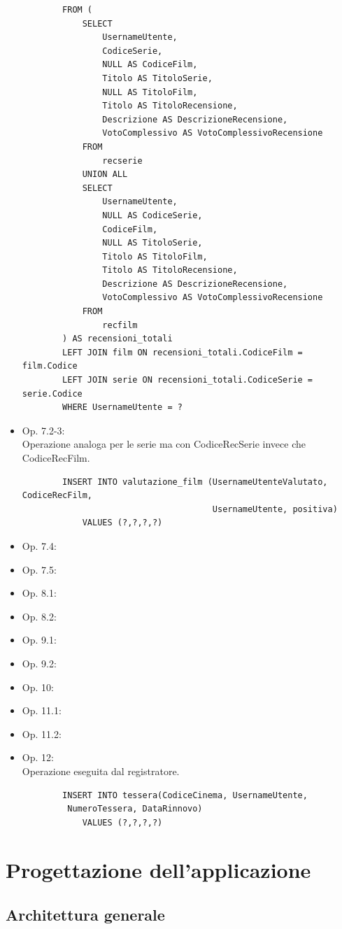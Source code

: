 \documentclass[a4paper,12pt]{report}
\begin{document}
\begin{itemize}
\begin{verbatim}
		FROM (
			SELECT
				UsernameUtente,
				CodiceSerie,
				NULL AS CodiceFilm,
				Titolo AS TitoloSerie,
				NULL AS TitoloFilm,
				Titolo AS TitoloRecensione,
				Descrizione AS DescrizioneRecensione,
				VotoComplessivo AS VotoComplessivoRecensione
			FROM
				recserie
			UNION ALL
			SELECT
				UsernameUtente,
				NULL AS CodiceSerie,
				CodiceFilm,
				NULL AS TitoloSerie,
				Titolo AS TitoloFilm,
				Titolo AS TitoloRecensione,
				Descrizione AS DescrizioneRecensione,
				VotoComplessivo AS VotoComplessivoRecensione
			FROM
				recfilm
		) AS recensioni_totali
		LEFT JOIN film ON recensioni_totali.CodiceFilm = film.Codice
		LEFT JOIN serie ON recensioni_totali.CodiceSerie = serie.Codice
		WHERE UsernameUtente = ?
	\end{verbatim}
	\item Op. 7.2-3:\\
	Operazione analoga per le serie ma con CodiceRecSerie invece che CodiceRecFilm.
	\begin{verbatim}
		INSERT INTO valutazione_film (UsernameUtenteValutato, CodiceRecFilm,
									  UsernameUtente, positiva)
			VALUES (?,?,?,?)
	\end{verbatim}
	\item Op. 7.4: 
	\item Op. 7.5: 
	\item Op. 8.1: 
	\item Op. 8.2: 
	\item Op. 9.1: 
	\item Op. 9.2: 
	\item Op. 10: 
	\item Op. 11.1: 
	\item Op. 11.2: 
	\item Op. 12:\\
	Operazione eseguita dal registratore.
	\begin{verbatim}
		INSERT INTO tessera(CodiceCinema, UsernameUtente,
		 NumeroTessera, DataRinnovo)
			VALUES (?,?,?,?)
	\end{verbatim}
\end{itemize}

\chapter{Progettazione dell'applicazione}
\section{Architettura generale}
\end{document}
